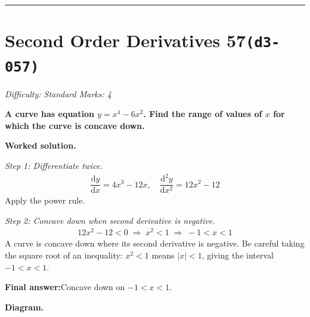 \documentclass[11pt]{article}
\newcommand{\question}[1]{\par\medskip\noindent\textbf{#1}\par}
\begin{document}
\medskip\hrule

\section*{Second Order Derivatives 57\quad\small\texttt{(d3-057)}}
\textit{Difficulty: Standard \quad\textbar\quad Marks: 4}

\question{A curve has equation \( y = x^4 - 6x^2 \). Find the range of values of \( x \) for which the curve is concave down.}

\textbf{Worked solution.}

\textit{Step 1: Differentiate twice.}
\[\begin{gathered}
\dfrac{\mathrm{d}y}{\mathrm{d}x} = 4x^3 - 12x, \quad \dfrac{\mathrm{d}^2y}{\mathrm{d}x^2} = 12x^2 - 12
\end{gathered}\]
Apply the power rule.

\textit{Step 2: Concave down when second derivative is negative.}
\[\begin{gathered}
12x^2 - 12 < 0 \;\Rightarrow\; x^2 < 1 \;\Rightarrow\; -1 < x < 1
\end{gathered}\]
A curve is concave down where its second derivative is negative. Be careful taking the square root of an inequality: \(x^2 < 1\) means \(|x| < 1\), giving the interval \(-1 < x < 1\).

\begin{answerbox}
\textbf{Final answer:}\quad Concave down on \(\displaystyle  -1 < x < 1 \).
\end{answerbox}
\textbf{Diagram.}
\end{document}
